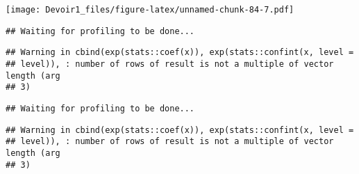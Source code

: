 \documentclass[]{article}
\newenvironment{Shaded}{\begin{snugshade}}{\end{snugshade}}
\newcommand{\KeywordTok}[1]{\textcolor[rgb]{0.13,0.29,0.53}{\textbf{#1}}}
\newcommand{\DataTypeTok}[1]{\textcolor[rgb]{0.13,0.29,0.53}{#1}}
\newcommand{\DecValTok}[1]{\textcolor[rgb]{0.00,0.00,0.81}{#1}}
\newcommand{\StringTok}[1]{\textcolor[rgb]{0.31,0.60,0.02}{#1}}
\newcommand{\OperatorTok}[1]{\textcolor[rgb]{0.81,0.36,0.00}{\textbf{#1}}}
\newcommand{\NormalTok}[1]{#1}
\begin{document}
\texttt{[image: Devoir1\_files/figure-latex/unnamed-chunk-84-7.pdf]}

\begin{Shaded}
\end{Shaded}

\begin{verbatim}
## Waiting for profiling to be done...
\end{verbatim}

\begin{verbatim}
## Warning in cbind(exp(stats::coef(x)), exp(stats::confint(x, level =
## level)), : number of rows of result is not a multiple of vector length (arg
## 3)
\end{verbatim}

\begin{verbatim}
## Waiting for profiling to be done...
\end{verbatim}

\begin{verbatim}
## Warning in cbind(exp(stats::coef(x)), exp(stats::confint(x, level =
## level)), : number of rows of result is not a multiple of vector length (arg
## 3)
\end{verbatim}
\end{document}
